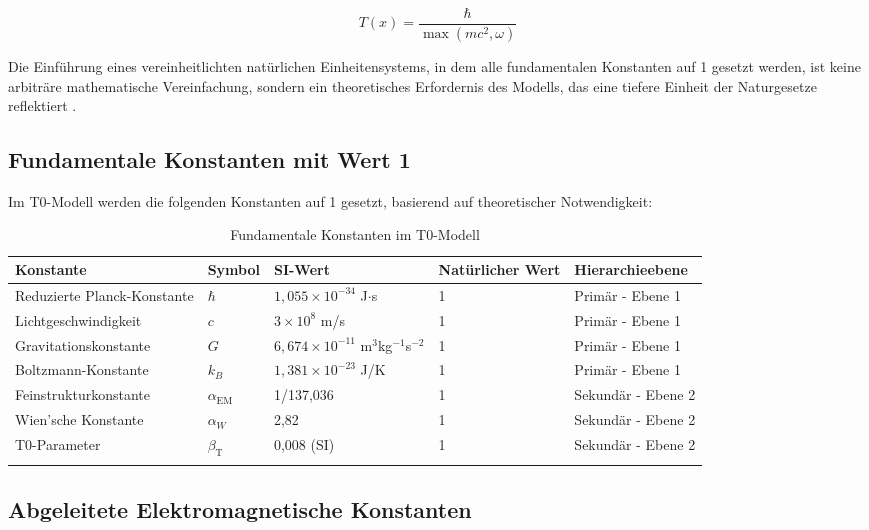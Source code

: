\documentclass[12pt,a4paper]{article}
\newcommand{\Tfield}{T(x)}
\newcommand{\alphaEM}{\alpha_{\text{EM}}}
\newcommand{\betaT}{\beta_{\text{T}}}
\begin{document}
	\begin{equation}
		\Tfield = \frac{\hbar}{\max(mc^2, \omega)}
	\end{equation}
	
	Die Einführung eines vereinheitlichten natürlichen Einheitensystems, in dem alle fundamentalen Konstanten auf 1 gesetzt werden, ist keine arbiträre mathematische Vereinfachung, sondern ein theoretisches Erfordernis des Modells, das eine tiefere Einheit der Naturgesetze reflektiert \cite{pascher_alphabeta_2025}.
	
	\subsection{Fundamentale Konstanten mit Wert 1}
	
	Im T0-Modell werden die folgenden Konstanten auf 1 gesetzt, basierend auf theoretischer Notwendigkeit:
	
	\begin{table}[h]
		\centering
		\begin{adjustbox}{scale=0.75}
			\begin{tabular}{lllll}
				\hline
				\textbf{Konstante} & \textbf{Symbol} & \textbf{SI-Wert} & \textbf{Natürlicher Wert} & \textbf{Hierarchieebene} \\
				\hline
				Reduzierte Planck-Konstante & $\hbar$ & $1,055 \times 10^{-34}$ J$\cdot$s & 1 & Primär - Ebene 1 \\
				Lichtgeschwindigkeit & $c$ & $3 \times 10^8$ m/s & 1 & Primär - Ebene 1 \\
				Gravitationskonstante & $G$ & $6,674 \times 10^{-11}$ m$^3$kg$^{-1}$s$^{-2}$ & 1 & Primär - Ebene 1 \\
				Boltzmann-Konstante & $k_B$ & $1,381 \times 10^{-23}$ J/K & 1 & Primär - Ebene 1 \\
				Feinstrukturkonstante & $\alphaEM$ & 1/137,036 & 1 & Sekundär - Ebene 2 \\
				Wien'sche Konstante & $\alpha_W$ & 2,82 & 1 & Sekundär - Ebene 2 \\
				T0-Parameter & $\betaT$ & 0,008 (SI) & 1 & Sekundär - Ebene 2 \\
				\hline
				\multicolumn{4}{c}{} \\
				\hline
			\end{tabular}
		\end{adjustbox}
		\caption{Fundamentale Konstanten im T0-Modell}
		\label{tab:fund_const}
	\end{table}
	
	\subsection{Abgeleitete Elektromagnetische Konstanten}
	
\end{document}
